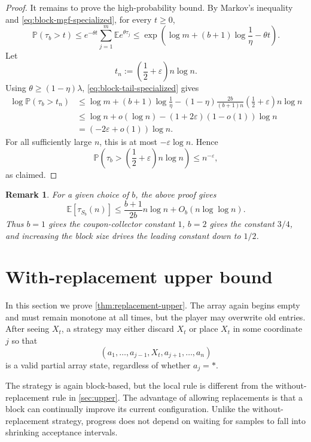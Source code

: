 \documentclass[11pt,reqno,letterpaper]{amsart}
\newtheorem{remark}[theorem]{Remark}
\theoremstyle{definition}
\numberwithin{equation}{section}
\newcommand{\E}{\mathbb{E}}
\renewcommand{\P}{\mathbb{P}}
\newcommand{\eps}{\varepsilon}
\newcommand{\mb}{\mathbb}
\begin{document}
\begin{proof}
It remains to prove the high-probability bound. By Markov's inequality and \eqref{eq:block-mgf-specialized}, for every \(t\ge0\),
\begin{equation}\label{eq:block-tail-specialized}
\P(\tau_b>t)
\le
e^{-\theta t}\sum_{j=1}^m \E e^{\theta\tau_j}
\le
\exp\left(
\log m+(b+1)\log\frac1\eta-\theta t
\right).
\end{equation}
Let
\[
t_n:=\left(\frac12+\eps\right)n\log n.
\]
Using \(\theta\ge (1-\eta)\lambda\), \eqref{eq:block-tail-specialized} gives
\begin{align*}
\log \P(\tau_b>t_n)
&\le
\log m+(b+1)\log\frac1\eta
-
(1-\eta)\frac{2b}{(b+1)n}
\left(\frac12+\eps\right)n\log n  \\
&\le
\log n+o(\log n)
-
(1+2\eps)(1-o(1))\log n  \\
&=
(-2\eps+o(1))\log n.
\end{align*}
For all sufficiently large \(n\), this is at most \(-\eps\log n\). Hence
\[
\P\left(\tau_b>\left(\frac12+\eps\right)n\log n\right)\le n^{-\eps},
\]
as claimed.
\end{proof}

\begin{remark}\label{rem:fixed-b}
For a given choice of \(b\), the above proof gives
\[
\mb{E}[\tau_{S_b}(n)]
\le
\frac{b+1}{2b}n\log n+O_b(n\log\log n).
\]
Thus \(b=1\) gives the coupon-collector constant \(1\), \(b=2\) gives the constant \(3/4\), and increasing the block size drives the leading constant down to \(1/2\).
\end{remark}


\section{With-replacement upper bound}
\label{sec:upper-bound-with-replacement}
In this section we prove \cref{thm:replacement-upper}. The array again begins empty and must remain monotone at all times, but the player may overwrite old entries.  After seeing \(X_t\), a strategy may either discard \(X_t\) or place \(X_t\) in some coordinate \(j\) so that
\[
(a_1,\ldots,a_{j-1},X_t,a_{j+1},\ldots,a_n)
\]
is a valid partial array state, regardless of whether \(a_j=\ast\).

The strategy is again block-based, but the local rule is different from the without-replacement rule in \cref{sec:upper}. The advantage of allowing replacements is that a block can continually improve its current configuration. Unlike the without-replacement strategy, progress does not depend on waiting for samples to fall into shrinking acceptance intervals.
\end{document}
